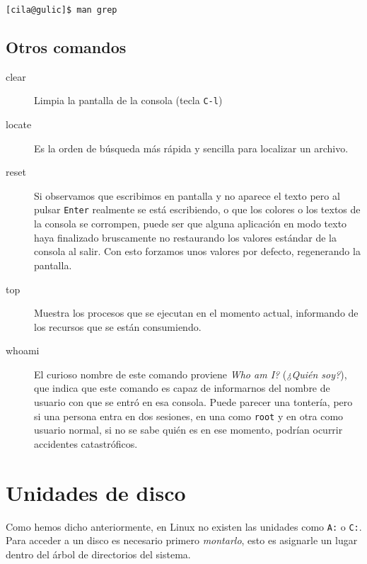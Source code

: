 \begin{verbatim}
[cila@gulic]$ man grep
\end{verbatim}

\subsection{Otros comandos}

\begin{description}

\item [clear]  Limpia la pantalla de  la consola
(tecla {\tt C-l})

\item  [locate] Es  la  orden  de búsqueda  más
rápida y sencilla para localizar un archivo.

\item  [reset] Si  observamos que  escribimos en
pantalla y no aparece el texto pero al pulsar {\tt Enter} realmente se
está escribiendo,  o que  los colores  o los textos  de la  consola se
corrompen,  puede  ser  que  alguna  aplicación  en  modo  texto  haya
finalizado  bruscamente  no restaurando  los  valores  estándar de  la
consola  al  salir.  Con  esto  forzamos  unos  valores  por  defecto,
regenerando la pantalla.

\item [top]  Muestra los procesos que  se ejecutan
en  el  momento  actual,  informando  de los  recursos  que  se  están
consumiendo.

\item  [whoami]  El   curioso  nombre  de  este
comando proviene {\em  Who am I?} ({\em ¿Quién soy?}),  que indica que
este comando es capaz de informarnos  del nombre de usuario con que se
entró en esa consola. Puede parecer  una tontería, pero si una persona
entra en dos sesiones,  en una como {\tt root} y  en otra como usuario
normal,  si no  se  sabe  quién es  en  ese  momento, podrían  ocurrir
accidentes catastróficos.

\end{description}

\section{Unidades de disco}

Como hemos dicho anteriormente, en  Linux no existen las unidades como
{\tt A:} o {\tt C:}. Para acceder a un disco es necesario primero {\em
montarlo}, esto  es asignarle un lugar  dentro del árbol
de directorios del sistema.

